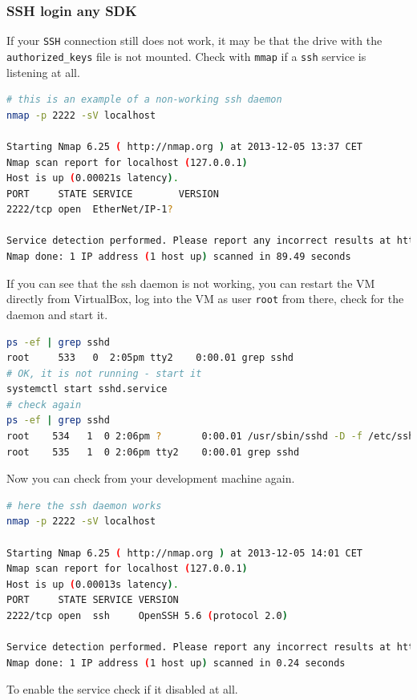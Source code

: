\subsubsection{SSH login any SDK}
%
If your \verb,SSH, connection still does not work, it may be that the drive with the \verb,authorized_keys, file is not mounted.
Check with \verb,mmap,\cite{nm01} if a \verb,ssh, service is listening at all.
%
\begin{lstlisting}[language=bash]
# this is an example of a non-working ssh daemon
nmap -p 2222 -sV localhost

Starting Nmap 6.25 ( http://nmap.org ) at 2013-12-05 13:37 CET
Nmap scan report for localhost (127.0.0.1)
Host is up (0.00021s latency).
PORT     STATE SERVICE        VERSION
2222/tcp open  EtherNet/IP-1?

Service detection performed. Please report any incorrect results at http://nmap.org/submit/ .
Nmap done: 1 IP address (1 host up) scanned in 89.49 seconds
\end{lstlisting}
%
If you can see that the ssh daemon is not working, you can restart the VM directly from VirtualBox, log into the VM as user \verb,root, from there, check for the daemon and start it.
%
\begin{lstlisting}[language=bash]
ps -ef | grep sshd
root     533   0  2:05pm tty2    0:00.01 grep sshd
# OK, it is not running - start it
systemctl start sshd.service
# check again
ps -ef | grep sshd
root    534   1  0 2:06pm ?       0:00.01 /usr/sbin/sshd -D -f /etc/ssh/sshd_config_engine
root    535   1  0 2:06pm tty2    0:00.01 grep sshd
\end{lstlisting}
%
Now you can check from your development machine again.
%
\begin{lstlisting}[language=bash]
# here the ssh daemon works
nmap -p 2222 -sV localhost

Starting Nmap 6.25 ( http://nmap.org ) at 2013-12-05 14:01 CET
Nmap scan report for localhost (127.0.0.1)
Host is up (0.00013s latency).
PORT     STATE SERVICE VERSION
2222/tcp open  ssh     OpenSSH 5.6 (protocol 2.0)

Service detection performed. Please report any incorrect results at http://nmap.org/submit/ .
Nmap done: 1 IP address (1 host up) scanned in 0.24 seconds
\end{lstlisting}
%
To enable the service check if it disabled at all.
%
